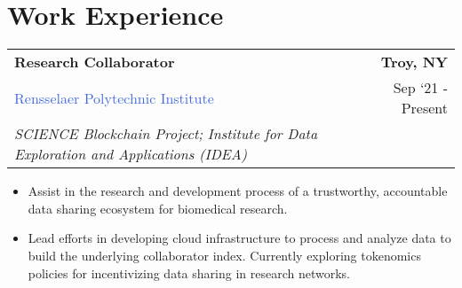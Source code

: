 \documentclass[10pt]{article}
\newcommand{\highlightcolor}{RoyalBlue}
\newcommand{\tabularxwidth}{\textwidth}
\begin{document}
    
        \section{Work Experience}

    
    \begin{minipage}{\tabularxwidth}

        \begin{tabularx}{\tabularxwidth}{X r}
            \textbf{Research Collaborator} & \textbf{Troy, 
        NY} \\
            
    
    
    

    
        \textcolor{\highlightcolor}{Rensselaer Polytechnic Institute} & 
        
    Sep ‘21 - Present \\
        
            \textit{SCIENCE Blockchain Project;}
                \textit{Institute for Data Exploration and Applications (IDEA)} & \\
        
    
            
        \end{tabularx}

        \begin{itemize}[noitemsep, topsep=3pt, parsep=0pt, partopsep=0pt]
            
                \item 
    Assist in the research and development process of a trustworthy, accountable data sharing ecosystem for biomedical research.
            
                \item 
    Lead efforts in developing cloud infrastructure to process and analyze data to build the underlying collaborator index. Currently exploring tokenomics policies for incentivizing data sharing in research networks.
            

\end{itemize}
\end{minipage}
\end{document}
